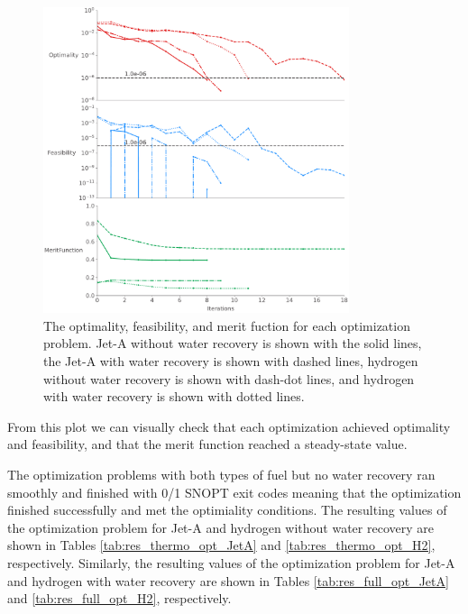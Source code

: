 \documentclass[conf]{new-aiaa}
\begin{document}
\begin{figure}[hbt!]
    \centering
    \includegraphics[width=0.8\textwidth]{opt_summary.pdf}
    \caption{The optimality, feasibility, and merit fuction for each optimization problem.
        Jet-A without water recovery is shown with the solid lines, the Jet-A with water recovery is shown with dashed lines, hydrogen without water recovery is shown with dash-dot lines, and hydrogen with water recovery is shown with dotted lines.}
    \label{fig:history_clvr}
\end{figure}

From this plot we can visually check that each optimization achieved optimality and feasibility, and that the merit function reached a steady-state value.


The optimization problems with both types of fuel but no water recovery ran smoothly and finished with 0/1 SNOPT exit codes meaning that the optimization finished successfully and met the optimiality conditions.
The resulting values of the optimization problem for Jet-A and hydrogen without water recovery are shown in Tables \ref{tab:res_thermo_opt_JetA} and \ref{tab:res_thermo_opt_H2}, respectively.
Similarly, the resulting values of the optimization problem for Jet-A and hydrogen with water recovery are shown in Tables \ref{tab:res_full_opt_JetA} and \ref{tab:res_full_opt_H2}, respectively.
\end{document}
